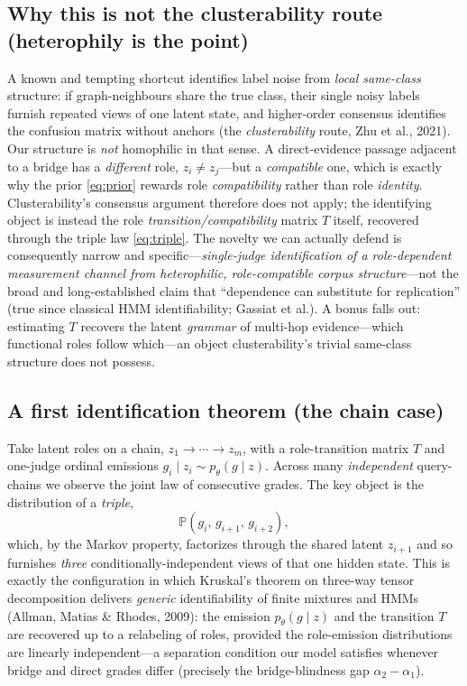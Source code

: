 \documentclass[11pt]{article}
\renewcommand{\Pr}{\mathbb{P}}
\begin{document}
\subsection{Why this is not the clusterability route (heterophily is the point)}
A known and tempting shortcut identifies label noise from \emph{local same-class} structure: if graph-neighbours
share the true class, their single noisy labels furnish repeated views of one latent state, and higher-order
consensus identifies the confusion matrix without anchors (the \emph{clusterability} route, Zhu et al., 2021).
Our structure is \emph{not} homophilic in that sense. A direct-evidence passage adjacent to a bridge has a
\emph{different} role, $z_i\neq z_j$---but a \emph{compatible} one, which is exactly why the prior
\eqref{eq:prior} rewards role \emph{compatibility} rather than role \emph{identity}. Clusterability's consensus
argument therefore does not apply; the identifying object is instead the role \emph{transition/compatibility}
matrix $T$ itself, recovered through the triple law \eqref{eq:triple}. The novelty we can actually defend is
consequently narrow and specific---\emph{single-judge identification of a role-dependent measurement channel
from heterophilic, role-compatible corpus structure}---not the broad and long-established claim that
``dependence can substitute for replication'' (true since classical HMM identifiability; Gassiat et al.). A
bonus falls out: estimating $T$ recovers the latent \emph{grammar} of multi-hop evidence---which functional
roles follow which---an object clusterability's trivial same-class structure does not possess.

\subsection{A first identification theorem (the chain case)}
Take latent roles on a chain, $z_1\!\to\!\cdots\!\to\!z_m$, with a role-transition matrix $T$ and one-judge
ordinal emissions $g_i\mid z_i\sim p_\theta(g\mid z)$. Across many \emph{independent} query-chains we observe
the joint law of consecutive grades. The key object is the distribution of a \emph{triple},
\begin{equation}\label{eq:triple}
  \Pr(g_i,\,g_{i+1},\,g_{i+2}),
\end{equation}
which, by the Markov property, factorizes through the shared latent $z_{i+1}$ and so furnishes \emph{three}
conditionally-independent views of that one hidden state. This is exactly the configuration in which Kruskal's
theorem on three-way tensor decomposition delivers \emph{generic} identifiability of finite mixtures and HMMs
(Allman, Matias \& Rhodes, 2009): the emission $p_\theta(g\mid z)$ and the transition $T$ are recovered up to a
relabeling of roles, provided the role-emission distributions are linearly independent---a separation condition
our model satisfies whenever bridge and direct grades differ (precisely the bridge-blindness gap
$\alpha_2-\alpha_1$).
\end{document}
